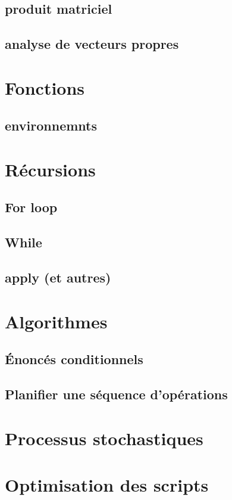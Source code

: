 \documentclass[french,]{article}
\begin{document}
\subsection{produit matriciel}\label{produit-matriciel}

\subsection{analyse de vecteurs
propres}\label{analyse-de-vecteurs-propres}

\newpage

\section{Fonctions}\label{fonctions}

\subsection{environnemnts}\label{environnemnts}

\newpage

\section{Récursions}\label{recursions}

\subsection{For loop}\label{for-loop}

\subsection{While}\label{while}

\subsection{apply (et autres)}\label{apply-et-autres}

\newpage

\section{Algorithmes}\label{algorithmes}

\subsection{Énoncés conditionnels}\label{enonces-conditionnels}

\subsection{Planifier une séquence
d'opérations}\label{planifier-une-sequence-doperations}

\newpage

\section{Processus stochastiques}\label{processus-stochastiques}

\newpage

\section{Optimisation des scripts}\label{optimisation-des-scripts}
\end{document}
